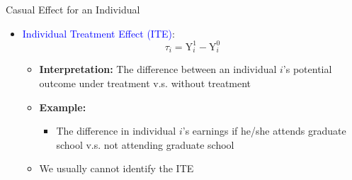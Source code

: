 \documentclass[hyperref={pdfpagelabels=false}]{beamer}
\begin{document}
\begin{frame}{Casual Effect for an Individual}
\begin{itemize} 

\item \textcolor{blue} {Individual Treatment Effect (ITE)}:
\begin{equation*}
\tau_i = \mathrm{Y}^{1}_{i} - \mathrm{Y}^{0}_{i}
\end{equation*}		

\begin{itemize} 
\vspace{0.2cm}
\item \textbf{Interpretation:}  The difference between an individual $i$'s potential outcome under treatment v.s. without treatment

\vspace{0.2cm}	
\item \textbf{Example:}
\vspace{0.2cm}	
\begin{itemize} 
\item The difference in individual $i$'s earnings if he/she attends graduate school v.s. not attending graduate school
\end{itemize}		

\vspace{0.2cm}
\item We usually cannot identify the ITE


\end{itemize}


\end{itemize}
\end{frame}
\end{document}
